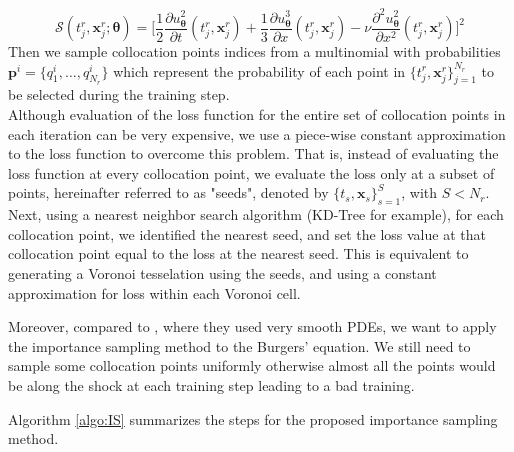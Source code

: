\documentclass[12pt,openany]{amsbook}
\newcommand{\bbm}[1]{{\mathbf{#1}}}
\begin{document}
\begin{equation}
    \mathcal{S}(t_j^r, \bbm x_j^r; \bm \theta) = \Big[ \frac{1}{2}\frac{\partial u_{\bm \theta}^2}{\partial t}(t_j^r,\bbm x_j^r) 
+ \frac{1}{3}\frac{\partial u_{\bm \theta}^3}{\partial x}(t_j^r,\bbm x_j^r)
- \nu \frac{\partial^2 u_{\bm \theta}^2}{\partial x^2}(t_j^r,\bbm x_j^r) \Big]^2
\end{equation}
Then we sample collocation points indices from a multinomial with probabilities 
$\bbm p^i = \{q_1^i, \ldots,q_{N_r}^i\}$ which represent the probability of each point in $\{t_j^r, \bbm x_j^r\}_{j=1}^{N_r}$
to be selected during the training step.\\

Although evaluation of the loss function for the entire set of collocation points in each iteration can
be very expensive, we use a piece-wise constant approximation to the loss
function to overcome this problem. That is, instead of evaluating the loss function at every collocation point, we evaluate the
loss only at a subset of points, hereinafter referred to as "seeds", denoted by $\{t_s, \bbm x_s\}_{s=1}^S$, with $S<N_r$. 
Next, using a nearest neighbor search algorithm (KD-Tree for example), for each collocation point, we identified the
nearest seed, and set the loss value at that collocation point equal to the loss at the nearest
seed. This is equivalent to generating a Voronoi tesselation using the seeds, 
and using a constant approximation for loss within each Voronoi cell.

Moreover, compared to \cite{Nabian_2021}, where they used very smooth PDEs, we want to apply the importance sampling method to the 
Burgers' equation. We still need to sample some collocation points uniformly 
otherwise almost all the points would be along the shock at each training step leading to a bad training.

Algorithm \ref{algo:IS} summarizes the steps for the proposed importance sampling method.\\
\end{document}
